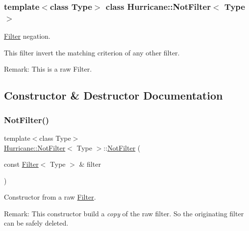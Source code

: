 \subsubsection*{template$<$class Type$>$\newline
class Hurricane\+::\+Not\+Filter$<$ Type $>$}

\mbox{\hyperlink{classHurricane_1_1Filter}{Filter}} negation. 

This filter invert the matching criterion of any other filter.

\begin{DoxyParagraph}{Remark\+: This is a raw Filter.}

\end{DoxyParagraph}


\subsection{Constructor \& Destructor Documentation}
\mbox{\label{classHurricane_1_1NotFilter_a8c75f2e192929c1b559f4ca876e47126}} 
\subsubsection{\texorpdfstring{Not\+Filter()}{NotFilter()}\hspace{0.1cm}{\footnotesize\ttfamily [1/2]}}
{\footnotesize\ttfamily template$<$class Type$>$ \\
\mbox{\hyperlink{classHurricane_1_1NotFilter}{Hurricane\+::\+Not\+Filter}}$<$ Type $>$\+::\mbox{\hyperlink{classHurricane_1_1NotFilter}{Not\+Filter}} (\begin{DoxyParamCaption}\item[{const \mbox{\hyperlink{classHurricane_1_1Filter}{Filter}}$<$ Type $>$ \&}]{filter }\end{DoxyParamCaption})\hspace{0.3cm}{\ttfamily [inline]}}

Constructor from a raw \mbox{\hyperlink{classHurricane_1_1Filter}{Filter}}.

\begin{DoxyParagraph}{Remark\+: This constructor build a {\itshape copy} of the raw filter. So the originating}
filter can be safely deleted. 
\end{DoxyParagraph}
\mbox{\label{classHurricane_1_1NotFilter_a232102dc584111a704e66b2ac793af86}} 
